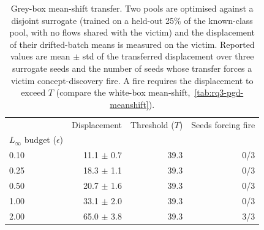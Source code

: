 \begin{table}
\caption{Grey-box mean-shift transfer. Two pools are optimised against a disjoint surrogate (trained on a held-out 25\% of the known-class pool, with no flows shared with the victim) and the displacement of their drifted-batch means is measured on the victim. Reported values are mean $\pm$ std of the transferred displacement over three surrogate seeds and the number of seeds whose transfer forces a victim concept-discovery fire. A fire requires the displacement to exceed $T$ (compare the white-box mean-shift,~\cref{tab:rq3-pgd-meanshift}).}
\label{tab:rq3-pgd-meanshift-greybox}
\centering
\begin{tabular}{lrrr}
\toprule
 & Displacement & Threshold ($T$) & Seeds forcing fire \\
$L_\infty$ budget ($\epsilon$) &  &  &  \\
\midrule
0.10 & 11.1 $\pm$ 0.7 & 39.3 & 0/3 \\
0.25 & 18.3 $\pm$ 1.1 & 39.3 & 0/3 \\
0.50 & 20.7 $\pm$ 1.6 & 39.3 & 0/3 \\
1.00 & 33.1 $\pm$ 2.0 & 39.3 & 0/3 \\
2.00 & 65.0 $\pm$ 3.8 & 39.3 & 3/3 \\
\bottomrule
\end{tabular}
\end{table}
